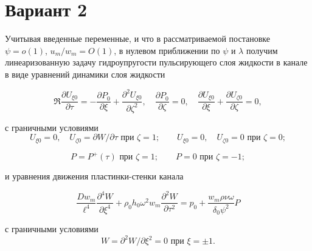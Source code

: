 \documentclass{article}
\begin{document}
\section*{Вариант 2}

Учитывая введенные переменные, и что в рассматриваемой постановке 
\( \psi = o(1) \), \( u_m / w_m = O(1) \), в нулевом приближении по \( \psi \) и \( \lambda \) 
получим линеаризованную задачу гидроупругости пульсирующего слоя жидкости в канале 
в виде уравнений динамики слоя жидкости  

\begin{equation}
\Re \frac{\partial U_{\xi 0}}{\partial \tau} = -\frac{\partial P_0}{\partial \xi} + \frac{\partial^2 U_{\xi 0}}{\partial \zeta^2}, \quad 
\frac{\partial P_0}{\partial \zeta} = 0, \quad 
\frac{\partial U_{\xi 0}}{\partial \xi} + \frac{\partial U_{\zeta 0}}{\partial \zeta} = 0,
\end{equation}
\vspace{-2pt}

с граничными условиями  
\vspace{-2pt}
\begin{equation}
U_{\xi 0} = 0, \quad U_{\zeta 0} = \partial W / \partial \tau\text{ при } \zeta = 1; \qquad 
U_{\xi 0} = 0, \quad U_{\zeta 0} = 0 \text{ при } \zeta = 0;
\end{equation}

\vspace{-22pt}

\begin{equation}
P = P^+(\tau) \text{ при } \zeta = 1; \qquad P = 0 \text{ при } \zeta = -1;
\end{equation}

и уравнения движения пластинки-стенки канала  

\vspace{0pt}
\begin{equation}
\frac{Dw_m}{\ell^4} \frac{\partial^4 W}{\partial \xi^4} + \rho_0 h_0 \omega^2 w_m \frac{\partial^2 W}{\partial \tau^2} = p_0 + \frac{w_m \rho \nu \omega}{\delta_0 \psi^2} P
\end{equation}
\vspace{-7pt}

с граничными условиями  
\vspace{-10pt}
\begin{equation}
W = \partial^2 W / \partial \xi^2 = 0 \text{ при } \xi = \pm 1.
\end{equation}
\end{document}
